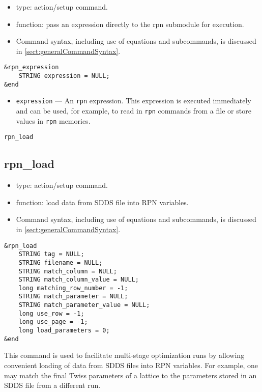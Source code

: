 \documentclass[11pt]{article}
\begin{document}
\begin{itemize}
\item type: action/setup command.
\item function: pass an expression directly to the rpn submodule for execution.
\item Command syntax, including use of equations and subcommands, is discussed in \ref{sect:generalCommandSyntax}.
\end{itemize}

\begin{verbatim}
&rpn_expression
    STRING expression = NULL;
&end
\end{verbatim}

\begin{itemize}
\item \verb|expression| --- An {\tt rpn} expression.  This expression is executed immediately and can be
used, for example, to read in {\tt rpn} commands from a file or store values in {\tt rpn} memories.
\end{itemize}

\newpage
\begin{center}{\Large\verb|rpn_load|}\end{center}
\subsection{rpn\_load \label{subsec:rpnload}}

\begin{itemize}
\item type: action/setup command.
\item function: load data from SDDS file into RPN variables.
\item Command syntax, including use of equations and subcommands, is discussed in \ref{sect:generalCommandSyntax}.
\end{itemize}

\begin{verbatim}
&rpn_load
    STRING tag = NULL;
    STRING filename = NULL;
    STRING match_column = NULL;
    STRING match_column_value = NULL;
    long matching_row_number = -1;
    STRING match_parameter = NULL;
    STRING match_parameter_value = NULL;
    long use_row = -1;
    long use_page = -1;
    long load_parameters = 0;
&end
\end{verbatim}

This command is used to facilitate multi-stage optimization runs by allowing convenient
loading of data from SDDS files into RPN variables.  For example, one may match the
final Twiss parameters of a lattice to the parameters stored in an SDDS file from
a different run.
\end{document}
